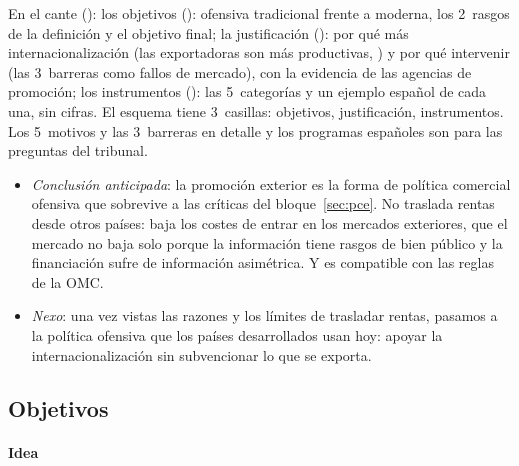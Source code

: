 \documentclass[11pt]{article}
\begin{document}
\begin{notaopositor}
En el cante (): los objetivos (): ofensiva tradicional frente a moderna, los 2~rasgos de la definición y el objetivo final; la justificación (): por qué más internacionalización (las exportadoras son más productivas, ) y por qué intervenir (las 3~barreras como fallos de mercado), con la evidencia de las agencias de promoción; los instrumentos (): las 5~categorías y un ejemplo español de cada una, sin cifras. El esquema tiene 3~casillas: objetivos, justificación, instrumentos. Los 5~motivos y las 3~barreras en detalle y los programas españoles son para las preguntas del tribunal.
\end{notaopositor}

\begin{itemize}
\item \emph{Conclusión anticipada}: la promoción exterior es la forma de política comercial ofensiva que sobrevive a las críticas del bloque~\ref{sec:pce}. No traslada rentas desde otros países: baja los costes de entrar en los mercados exteriores, que el mercado no baja solo porque la información tiene rasgos de bien público y la financiación sufre de información asimétrica. Y es compatible con las reglas de la OMC.
\item \emph{Nexo}: una vez vistas las razones y los límites de trasladar rentas, pasamos a la política ofensiva que los países desarrollados usan hoy: apoyar la internacionalización sin subvencionar lo que se exporta.
\end{itemize}

\subsection{Objetivos}\label{sec:objetivos}

\paragraph{Idea}
\end{document}

